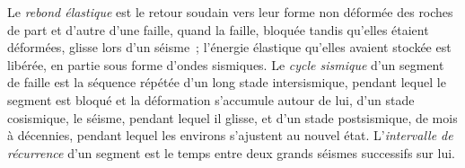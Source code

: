 \begin{definition}\label{def:b1:earthquake-source:seismic-cycle}
Le \emph{rebond élastique} est le retour soudain vers
leur forme non déformée des roches de part et d'autre d'une faille, quand la faille,
bloquée tandis qu'elles étaient déformées, glisse lors d'un séisme~; l'énergie élastique
qu'elles avaient stockée est libérée, en partie sous forme d'ondes sismiques. Le \emph{cycle
sismique} d'un segment de faille est la séquence répétée d'un
long stade intersismique, pendant lequel le segment est bloqué et la déformation
s'accumule autour de lui, d'un stade cosismique, le séisme, pendant lequel il
glisse, et d'un stade postsismique, de mois à décennies, pendant lequel les
environs s'ajustent au nouvel état. L'\emph{intervalle de
récurrence} d'un segment est le temps entre deux
grands séismes successifs sur lui.
\end{definition}

